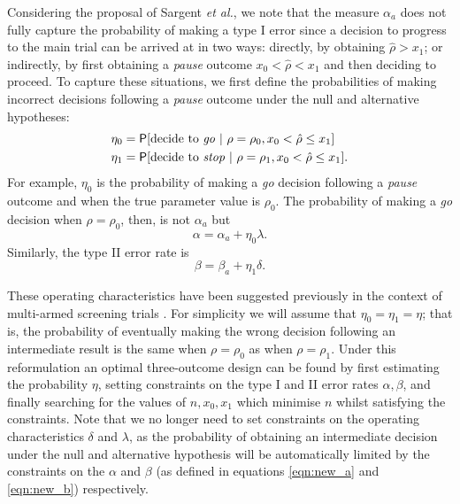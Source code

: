 \documentclass{bmcart}
\newcommand{\PR}{{\mathsf P}}
\begin{document}
Considering the proposal of Sargent \emph{et al.}, we note that the measure $\alpha_a$ does not fully capture the probability of making a type I error %
since a decision to progress to the main trial can be arrived at in two ways: directly, by obtaining $\hat{\rho} > x_1$; or indirectly, by first obtaining a \emph{pause} outcome $x_0 < \hat{\rho} < x_1$ and then deciding to proceed. To capture these situations, we first define the probabilities of making incorrect decisions following a \emph{pause} outcome under the null and alternative hypotheses:
\begin{align}
\eta_0 &= \PR[\text{decide to \emph{go}} ~|~ \rho = \rho_0, x_0 < \hat{\rho} \leq x_1] \\
\eta_1 &= \PR[\text{decide to \emph{stop}} ~|~ \rho = \rho_1, x_0 < \hat{\rho} \leq x_1].
\end{align}
For example, $\eta_0$ is the probability of making a \emph{go} decision following a \emph{pause} outcome and when the true parameter value is $\rho_0$. The probability of making a \emph{go} decision when $\rho = \rho_0$, then, is not $\alpha_a$ but
\begin{equation}\label{eqn:new_a}
\alpha = \alpha_a + \eta_0 \lambda.
\end{equation}
Similarly, the type II error rate is
\begin{equation}\label{eqn:new_b}
\beta = \beta_a + \eta_1 \delta.
\end{equation}

These operating characteristics have been suggested previously in the context of multi-armed screening trials \cite{Sargent2001a, Dehbi2020}. For simplicity we will assume that $\eta_0 = \eta_1 = \eta$; that is, the probability of eventually making the wrong decision following an intermediate result is the same when $\rho = \rho_0$ as when $\rho = \rho_1$. Under this reformulation an optimal three-outcome design can be found by first estimating the probability $\eta$, setting constraints on the type I and II error rates $\alpha, \beta$, and finally searching for the values of  $n, x_0, x_1$ which minimise $n$ whilst satisfying the constraints. Note that we no longer need to set constraints on the operating characteristics $\delta$ and $\lambda$, as the probability of obtaining an intermediate decision under the null and alternative hypothesis will be automatically limited by the constraints on the $\alpha$ and $\beta$ (as defined in equations \ref{eqn:new_a} and \ref{eqn:new_b}) respectively.
\end{document}
